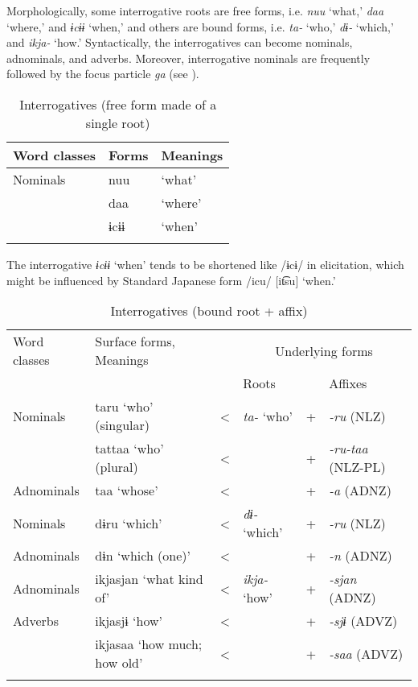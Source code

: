 Morphologically, some interrogative roots are free forms, i.e. \textit{nuu} ‘what,’ \textit{daa} ‘where,’ and \textit{ɨcɨɨ} ‘when,’ and others are bound forms, i.e. \textit{ta-} ‘who,’ \textit{dɨ-} ‘which,’ and \textit{ikja-} ‘how.’ Syntactically, the interrogatives can become nominals, adnominals, and adverbs. Moreover, interrogative nominals are frequently followed by the focus particle \textit{ga} (see ).

\begin{table}
\caption{\label{tab:key:38}Interrogatives (free form made of a single root)}
\begin{tabular}{lll}
Word classes  &  Forms & Meanings\\\midrule
Nominals  &  nuu  & ‘what’\\
          &  daa  & ‘where’\\
          &  ɨcɨɨ & ‘when’\\
\lspbottomrule
\end{tabular}
\end{table}

The interrogative \textit{ɨcɨɨ} ‘when’ tends to be shortened like /ɨcɨ/ in elicitation, which might be influenced by Standard Japanese form /icu/ [it͡su] ‘when.’

\begin{table}
\caption{\label{tab:key:39}Interrogatives (bound root + affix)}
\begin{tabular}{ll@{ }c@{ }l@{ }c@{ }l}
\lsptoprule
Word classes &   Surface forms,  Meanings & & \multicolumn{3}{c}{Underlying forms}\\\cmidrule{4-6}
             &                            & & Roots & &   Affixes\\\midrule

Nominals    & taru    ‘who’ (singular)       & < & \textit{ta-}  ‘who’    & + & \textit{{}-ru}  (NLZ)\\
            & tattaa  ‘who’ (plural)         & < &                        & + & \textit{{}-ru-taa}  (NLZ-PL)\\
Adnominals  & taa     ‘whose’                & < &                        & + & \textit{{}-a} (ADNZ)\\
Nominals    & dɨru    ‘which’                & < & \textit{dɨ-}  ‘which’  & + & \textit{{}-ru} (NLZ)\\
Adnominals  & dɨn     ‘which (one)’          & < &                        & + & \textit{{}-n} (ADNZ)\\
Adnominals  & ikjasjan ‘what kind of’        & < & \textit{ikja-}  ‘how’  & + & \textit{{}-sjan} (ADNZ)\\
Adverbs     & ikjasjɨ  ‘how’                 & < &                        & + & \textit{{}-sjɨ} (ADVZ) \\
            & ikjasaa  ‘how much; how old’   & < &                        & + & \textit{{}-saa} (ADVZ) \\
\lspbottomrule
\end{tabular}
\end{table}

